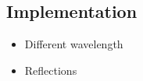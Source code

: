 \subsection{Implementation}
\begin{itemize}
  \item Different wavelength
  \item Reflections
\end{itemize}

